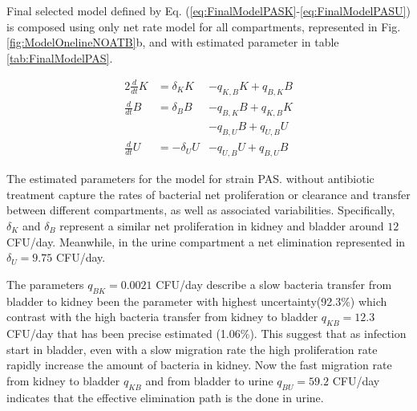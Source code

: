 \documentclass{article}
\begin{document}
Final selected model defined by Eq. (\ref{eq:FinalModelPASK}-\ref{eq:FinalModelPASU}) is composed using only net rate model for all compartments, represented in Fig. \ref{fig:ModelOnelineNOATB}b, and with estimated parameter in table \ref{tab:FinalModelPAS}.

\begin{alignat}{2}
\frac{d}{dt} K &=  \delta_K K &- q_{K,B} K + q_{B,K} B \label{eq:FinalModelPASK} \\
\frac{d}{dt} B &=  \delta_B B &- q_{B,K} B + q_{K,B} K \nonumber\\
&              & -q_{B,U} B + q_{U,B} U \label{eq:FinalModelPASB} \\
\frac{d}{dt} U &= - \delta_U U &- q_{U,B} U + q_{B,U} B \label{eq:FinalModelPASU}
\end{alignat}


The estimated parameters for the model for strain PAS. without antibiotic treatment capture the rates of bacterial net proliferation or clearance and transfer between different compartments, as well as associated variabilities. Specifically, $\delta_{K}$ and $\delta_{B}$ represent a similar net proliferation in kidney and bladder around $12$ CFU/day. Meanwhile, in the urine compartment a net elimination represented in $\delta_{U}=9.75$ CFU/day.

The parameters $q_{BK}=0.0021$ CFU/day describe a slow bacteria transfer from bladder to kidney been the parameter with highest uncertainty(92.3\%) which contrast with the high bacteria transfer from kidney to bladder $q_{KB} = 12.3$ CFU/day that has been precise estimated (1.06\%). This suggest that as infection start in bladder, even with a slow migration rate the high proliferation rate rapidly increase the amount of bacteria in kidney. Now the fast migration rate from kidney to bladder $q_{KB}$ and from bladder to urine $q_{BU}=59.2$ CFU/day indicates that the effective elimination path is the done in urine.
\end{document}
